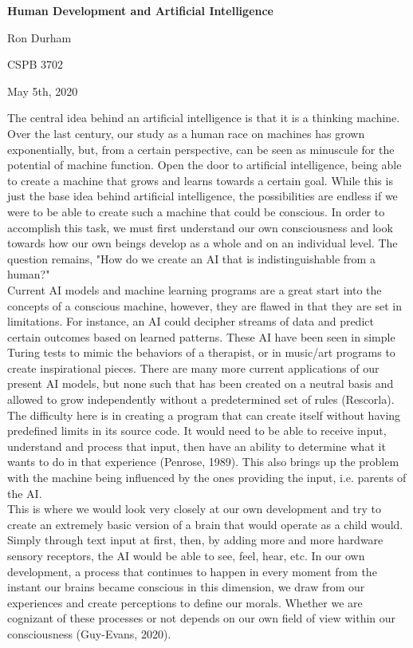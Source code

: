 \documentclass[11pt]{article}
\theoremstyle{plain}
\begin{document}
\centerline{\textbf{Human Development and Artificial Intelligence}}
\vspace{3mm}
\centerline{Ron Durham}
\centerline{CSPB 3702}
\centerline{May 5th, 2020}

\vspace{10mm}
The central idea behind an artificial intelligence is that it is a thinking machine. Over the last century, our study as a human race on machines has grown exponentially, but, from a certain perspective, can be seen as minuscule for the potential of machine function. Open the door to artificial intelligence, being able to create a machine that grows and learns towards a certain goal.  While this is just the base idea behind artificial intelligence, the possibilities are endless if we were to be able to create such a machine that could be conscious. In order to accomplish this task, we must first understand our own consciousness and look towards how our own beings develop as a whole and on an individual level. The question remains, "How do we create an AI that is indistinguishable from a human?" \\

Current AI models and machine learning programs are a great start into the concepts of a conscious machine, however, they are flawed in that they are set in limitations. For instance, an AI could decipher streams of data and predict certain outcomes based on learned patterns. These AI have been seen in simple Turing tests to mimic the behaviors of a therapist, or in music/art programs to create inspirational pieces. There are many more current applications of our present AI models, but none such that has been created on a neutral basis and allowed to grow independently without a predetermined set of rules (Rescorla). \\

The difficulty here is in creating a program that can create itself without having predefined limits in its source code. It would need to be able to receive input, understand and process that input, then have an ability to determine what it wants to do in that experience (Penrose, 1989). This also brings up the problem with the machine being influenced by the ones providing the input, i.e. parents of the AI.\\

This is where we would look very closely at our own development and try to create an extremely basic version of a brain that would operate as a child would. Simply through text input at first, then, by adding more and more hardware sensory receptors, the AI would be able to see, feel, hear, etc. In our own development, a process that continues to happen in every moment from the instant our brains became conscious in this dimension, we draw from our experiences and create perceptions to define our morals. Whether we are cognizant of these processes or not depends on our own field of view within our consciousness (Guy-Evans, 2020).\\
\end{document}
